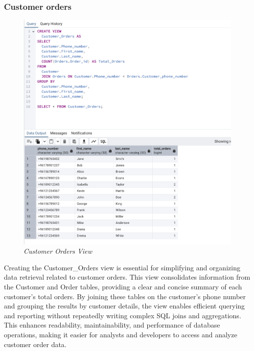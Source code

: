 \subsubsection{Customer orders}



\begin{figure}[H]
  \centering
  \includegraphics[width=1\textwidth]{images/sql/views/customer_orders.png}
  \caption{\textit{Customer Orders View}}
\end{figure}

Creating the Customer\_Orders view is essential for simplifying and organizing data retrieval related to customer orders. This view consolidates information from the Customer and Order tables, providing a clear and concise summary of each customer's total orders. By joining these tables on the customer's phone number and grouping the results by customer details, the view enables efficient querying and reporting without repeatedly writing complex SQL joins and aggregations. This enhances readability, maintainability, and performance of database operations, making it easier for analysts and developers to access and analyze customer order data.

